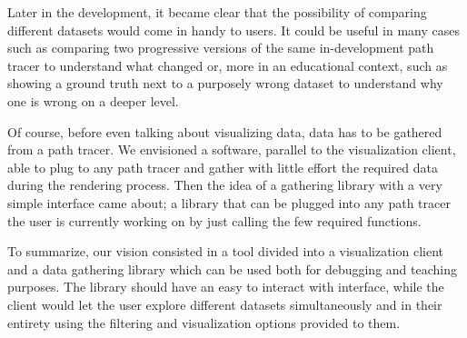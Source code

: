 Later in the development, it became clear that the possibility of comparing different datasets would come in handy to users. It could be useful in many cases such as comparing two progressive versions of the same in-development path tracer to understand what changed or, more in an educational context, such as showing a ground truth next to a purposely wrong dataset to understand why one is wrong on a deeper level.

Of course, before even talking about visualizing data, data has to be gathered from a path tracer. We envisioned a software, parallel to the visualization client, able to plug to any path tracer and gather with little effort the required data during the rendering process. Then the idea of a gathering library with a very simple interface came about; a library that can be plugged into any path tracer the user is currently working on by just calling the few required functions.

To summarize, our vision consisted in a tool divided into a visualization client and a data gathering library which can be used both for debugging and teaching purposes. The library should have an easy to interact with interface, while the client would let the user explore different datasets simultaneously and in their entirety using the filtering and visualization options provided to them.


